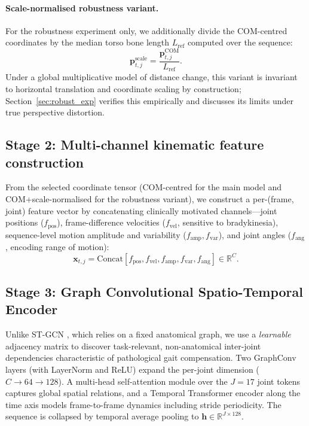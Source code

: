 \documentclass[preprint,12pt]{elsarticle}
\begin{document}
\paragraph{Scale-normalised robustness variant.}
For the robustness experiment only, we additionally divide the COM-centred
coordinates by the median torso bone length $L_{\text{ref}}$ computed over the
sequence:
\begin{equation}
\mathbf{p}^{\text{scale}}_{t,j}=\frac{\mathbf{p}^{\text{COM}}_{t,j}}{L_{\text{ref}}}.
\label{eq:norm}
\end{equation}
Under a global multiplicative model of distance change, this variant is
invariant to horizontal translation and coordinate scaling by construction;
Section~\ref{sec:robust_exp} verifies this empirically and discusses its limits
under true perspective distortion.

\subsection{Stage 2: Multi-channel kinematic feature construction}
\label{sec:stage2}
From the selected coordinate tensor (COM-centred for the main model and
COM+scale-normalised for the robustness variant), we construct a per-(frame,
joint) feature vector by concatenating clinically motivated channels---joint positions
($f_{\text{pos}}$), frame-difference velocities ($f_{\text{vel}}$,
sensitive to bradykinesia), sequence-level motion amplitude and variability
($f_{\text{amp}},f_{\text{var}}$), and joint angles
($f_{\text{ang}}$, encoding range of motion):
\begin{equation}
\mathbf{x}_{t,j}=\mathrm{Concat}\!\left[
f_{\text{pos}},f_{\text{vel}},f_{\text{amp}},f_{\text{var}},f_{\text{ang}}\right]\in\mathbb{R}^{C}.
\end{equation}

\subsection{Stage 3: Graph Convolutional Spatio-Temporal Encoder}
\label{sec:stage3}
Unlike ST-GCN \cite{yan2018spatial}, which relies on a fixed anatomical graph,
we use a \emph{learnable} adjacency matrix \cite{shi2019twoStream} to discover
task-relevant, non-anatomical inter-joint dependencies characteristic of
pathological gait compensation. Two GraphConv layers (with LayerNorm and ReLU)
expand the per-joint dimension ($C\!\to\!64\!\to\!128$). A multi-head
self-attention module over the $J=17$ joint tokens captures global spatial
relations, and a Temporal Transformer encoder along the time axis models
frame-to-frame dynamics including stride periodicity. The sequence is collapsed
by temporal average pooling to $\mathbf{h}\in\mathbb{R}^{J\times128}$.
\end{document}
